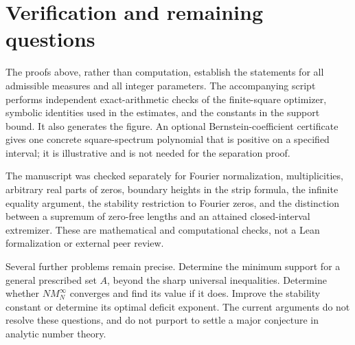 \documentclass[11pt]{article}
\theoremstyle{remark}\newtheorem{remark}[theorem]{Remark}
\begin{document}
\section{Verification and remaining questions}

The proofs above, rather than computation, establish the statements for all
admissible measures and all integer parameters. The accompanying script performs
independent exact-arithmetic checks of the finite-square optimizer, symbolic
identities used in the estimates, and the constants in the support bound. It
also generates the figure. An optional Bernstein-coefficient certificate gives
one concrete square-spectrum polynomial that is positive on a specified interval;
it is illustrative and is not needed for the separation proof.

The manuscript was checked separately for Fourier normalization, multiplicities,
arbitrary real parts of zeros, boundary heights in the strip formula, the
infinite equality argument, the stability restriction to Fourier zeros, and the
distinction between a supremum of zero-free lengths and an attained closed-interval
extremizer. These are mathematical and computational checks, not a Lean
formalization or external peer review.

Several further problems remain precise. Determine the minimum support for a
general prescribed set $A$, beyond the sharp universal inequalities. Determine
whether $N M_N^\infty$ converges and find its value if it does. Improve the
stability constant or determine its optimal deficit exponent. The current
arguments do not resolve these questions, and do not purport to settle a major
conjecture in analytic number theory.
\end{document}
